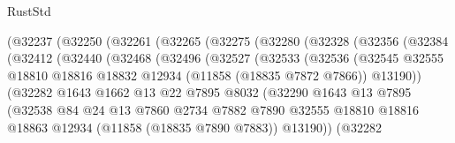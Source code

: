 \begin{lexlean}{RustStd}
\begin{coremodule}
                (@32237
                  (@32250
                    (@32261
                      (@32265
                        (@32275
                          (@32280
                            (@32328
                              (@32356
                                (@32384
                                  (@32412
                                    (@32440
                                      (@32468
                                        (@32496
                                          (@32527
                                            (@32533
                                              (@32536
                                                (@32545
                                                  @32555
                                                  @18810
                                                  @18816
                                                  @18832
                                                  @12934
                                                  (@11858 (@18835 @7872 @7866))
                                                  @13190))
                                              (@32282
                                                @1643
                                                @1662
                                                @13
                                                @22
                                                @7895
                                                @8032
                                                (@32290
                                                  @1643
                                                  @13
                                                  @7895
                                                  (@32538
                                                    @84
                                                    @24
                                                    @13
                                                    @7860
                                                    @2734
                                                    @7882
                                                    @7890
                                                    @32555
                                                    @18810
                                                    @18816
                                                    @18863
                                                    @12934
                                                    (@11858 (@18835 @7890 @7883))
                                                    @13190))
                                                (@32282

\end{coremodule}
\end{lexlean}
